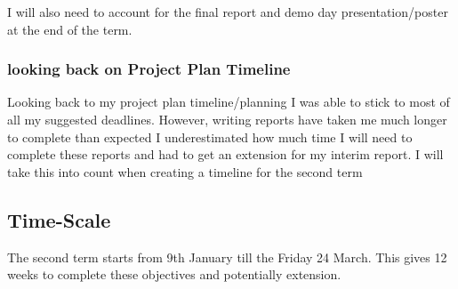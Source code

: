 \documentclass{report}
\begin{document}
I will also need to account for the final report and demo day presentation/poster at the end of the term.

\subsubsection{looking back on Project Plan Timeline}

Looking back to my project plan timeline/planning I was able to stick to most of all my suggested deadlines. However, writing reports have taken me much longer to complete than expected I underestimated how much time I will need to complete these reports and had to get an extension for my interim report. I will take this into count when creating a timeline for the second term

\subsection{Time-Scale}

The second term starts from 9th January till the Friday 24 March. This gives 12 weeks to complete these objectives and potentially extension. 
\end{document}
